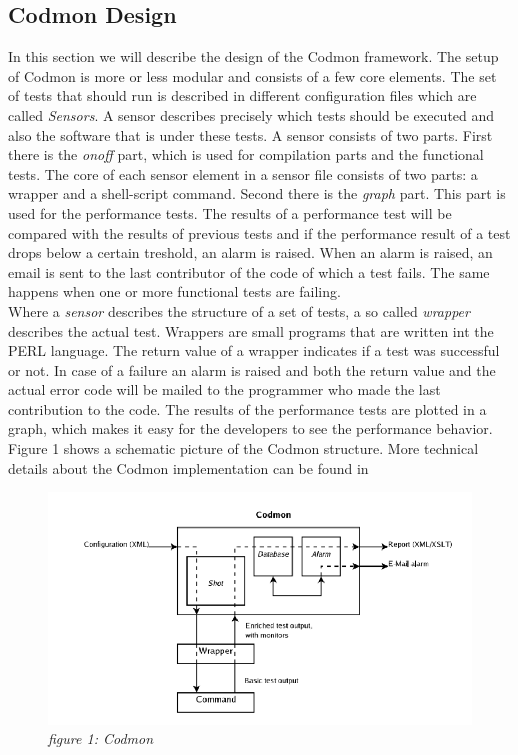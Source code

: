 \documentclass[a4paper,10pt]{scrartcl}
\begin{document}
\subsection{Codmon Design}
\label{subsec:CodmonDesign}
In this section we will describe the design of the Codmon framework. The setup of Codmon is more or less modular and consists of a few core elements. The set of tests that should run is described
in different configuration files which are called \emph{Sensors}. A sensor describes precisely which tests should be executed and also the software that is under these tests. A sensor consists of two
parts. First there is the \emph{onoff} part, which is used for compilation parts and the functional tests. The core of each sensor element in a sensor file consists of two parts: a wrapper and
a shell-script command. Second there is the \emph{graph} part. This part is used for the performance tests. The results of a performance test will be compared with the results of previous tests 
and if the performance result of a test drops below a certain treshold, an alarm is raised. When an alarm is raised, an email is sent to the last contributor of the code of which a test fails. 
The same happens when one or more functional tests are failing.\\

\noindent Where a \emph{sensor} describes the structure of a set of tests, a so called \emph{wrapper} describes the actual test. Wrappers are small programs that are written int the PERL
language. The return value of a wrapper indicates if a test was successful or not. In case of a failure an alarm is raised and both the return value and the actual error code will be mailed to
the programmer who made the last contribution to the code. The results of the performance tests are plotted in a graph, which makes it easy for the developers to see the performance
behavior. Figure 1 shows a schematic picture of the Codmon structure. More technical details about the Codmon implementation can be found in \cite{Codmon}

\begin{figure}[!ht]
  \caption{\emph{figure 1: Codmon}}
  \centering
    \includegraphics[scale=0.5]{codmon}
\end{figure}
\end{document}
